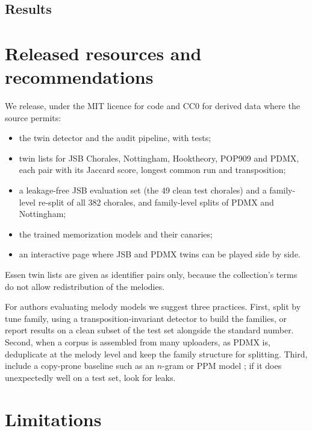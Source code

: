\documentclass[ProofPDF]{./Styles/Jnls-Template-V3}
\begin{document}
\subsection{Results}


\section{Released resources and recommendations}\label{sec:release}

We release, under the MIT licence for code and CC0 for derived data where the source permits:
\begin{itemize}
\item the twin detector and the audit pipeline, with tests;
\item twin lists for JSB Chorales, Nottingham, Hooktheory, POP909 and PDMX, each pair with its Jaccard score, longest common run and transposition;
\item a leakage-free JSB evaluation set (the 49 clean test chorales) and a family-level re-split of all 382 chorales, and family-level splits of PDMX and Nottingham;
\item the trained memorization models and their canaries;
\item an interactive page where JSB and PDMX twins can be played side by side.
\end{itemize}
Essen twin lists are given as identifier pairs only, because the collection's terms do not allow redistribution of the melodies.

For authors evaluating melody models we suggest three practices. First, split by tune family, using a transposition-invariant detector to build the families, or report results on a clean subset of the test set alongside the standard number. Second, when a corpus is assembled from many uploaders, as PDMX is, deduplicate at the melody level and keep the family structure for splitting. Third, include a copy-prone baseline such as an $n$-gram or PPM model \citep{pearce2005thesis}; if it does unexpectedly well on a test set, look for leaks.

\section{Limitations}\label{sec:limits}
\end{document}
